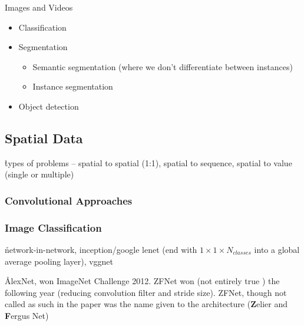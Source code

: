 



Images and Videos
\begin{itemize}[noitemsep,topsep=0pt]
	\item Classification
	\item Segmentation
	\begin{itemize}[noitemsep,topsep=0pt]
		\item Semantic segmentation (where we don't differentiate between instances)
		\item Instance segmentation
	\end{itemize}
	\item Object detection
\end{itemize}


\subsection{Spatial Data}

\r{types of problems -- spatial to spatial (1:1), spatial to sequence, spatial to value (single or multiple)}

\subsubsection{Convolutional Approaches}



\subsubsection{Image Classification}
\r{network-in-network, inception/google lenet (end with $1 \times 1 \times N_{classes}$ into a global average pooling layer), vggnet}

\r{AlexNet\cite{krizhevsky2012imagenet}, won ImageNet Challenge 2012. ZFNet\cite{DBLP:journals/corr/ZeilerF13} won (not entirely true ) the following year (reducing convolution filter and stride size). ZFNet, though not called as such in the paper was the name given to the architecture (\textbf{Z}elier and \textbf{F}ergus Net)}



